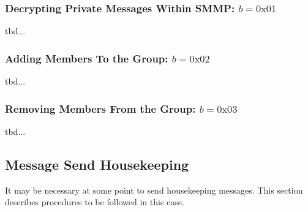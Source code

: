 \documentclass[%
preprint,
amsmath,amssymb,
aps,
prb,
floatfix,
]{revtex4-1}
\begin{document}
\subsubsection{\label{sec:imdecrypt}Decrypting Private Messages Within SMMP: $b =
0\mathrm{x}01$}

tbd...

\subsubsection{\label{sec:additions}Adding Members To the Group: $b =
0\mathrm{x}02$}

tbd...
\subsubsection{\label{sec:removal}Removing Members From the Group: $b =
0\mathrm{x}03$}

tbd...

\subsection{\label{sec:sendhousekeeping}Message Send Housekeeping}
It may be necessary at some point to send housekeeping messages. This section
describes procedures to be followed in this case.
\end{document}
